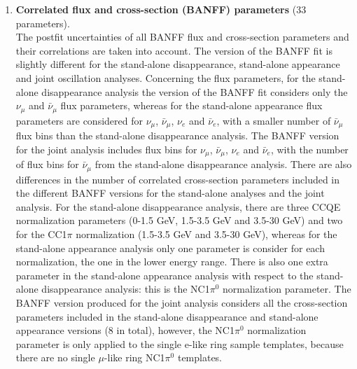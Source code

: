 \begin{enumerate}
In this analysis,the SuperK detector efficiency and FSI+SI systematics are considered together, adding their covariance matrices linearly, what it is possible since the same binning is used for both covariance matrices. Then, the PN covariance matrix is added linearly to the SK+FSI submatrix (12 x 12) related to the single e-like ring sample. Details of these uncertainties are given in 
Tab.\ \ref{tab:input_uncertainties}, and the final SK+FSI+SI+PN covariance matrix and fractional errors are presented in \ref{eq:Cskfsi} and \ref{fig:skfsi_frac} respectively. These efficiency/FSI/SI systematics are applied to the MC templates as shown in Tab.\ \ref{tab:apply_syst_to_1Rmu_templates} and \ref{tab:apply_syst_to_1Re_templates}.\\


\item 
{\bf Correlated flux and cross-section (BANFF) parameters} (33 parameters).\\

The postfit uncertainties of all BANFF flux and cross-section parameters and their correlations are taken into account.
The version of the BANFF fit is slightly different for the stand-alone disappearance, stand-alone appearance and joint oscillation analyses. 
Concerning the flux parameters, for the stand-alone disappearance analysis the version of the BANFF fit considers only the $\nu_\mu$ and $\bar{\nu}_{\mu}$ flux parameters, whereas for the stand-alone appearance flux parameters are considered for $\nu_\mu$, $\bar{\nu}_{\mu}$, $\nu_e$ and $\bar{\nu}_{e}$, with a smaller number of $\bar{\nu}_{\mu}$ flux bins than the stand-alone disappearance analysis. The BANFF version for the joint analysis includes flux bins for $\nu_\mu$, $\bar{\nu}_{\mu}$, $\nu_e$ and $\bar{\nu}_{e}$, with the number of flux bins for $\bar{\nu}_{\mu}$ from the stand-alone disappearance analysis. 
There are also differences in the number of correlated cross-section parameters included in the different BANFF versions for the stand-alone analyses and the joint analysis. For the stand-alone disappearance analysis, there are three CCQE normalization parameters (0-1.5 GeV, 1.5-3.5 GeV and 3.5-30 GeV) and two for the CC1$\pi$ normalization (1.5-3.5 GeV and 3.5-30 GeV), whereas for the stand-alone appearance analysis only one parameter is consider for each normalization, the one in the lower energy range. There is also one extra parameter in the stand-alone appearance analysis with respect to the stand-alone disappearance analysis: this is the NC1$\pi^{0}$ normalization parameter. The BANFF version produced for the joint analysis considers all the cross-section parameters included in the stand-alone disappearance and stand-alone appearance versions (8 in total), however, the NC1$\pi^{0}$ normalization parameter is only applied to the single e-like ring sample templates, because there are no single $\mu$-like ring NC1$\pi^{0}$ templates.


\end{enumerate}

